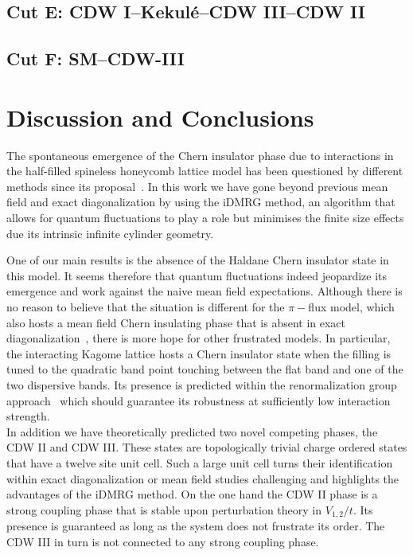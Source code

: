 \documentclass[aps,prx,10pt,twocolumn,floatfix,superscriptaddress,showpacs,numerical,footinbib]{revtex4-1}
\begin{document}
\subsection{Cut E: CDW I--Kekul\'e--CDW III--CDW II}

\subsection{Cut F: SM--CDW-III}


% 




%
\section{\label{sec:discconc}Discussion and Conclusions}
%

The spontaneous emergence of the Chern insulator phase due to interactions in the half-filled spineless honeycomb lattice
model has been questioned by different methods since its proposal~\cite{RQHZ08,WF10,GCC13,GGNVC13,DH14,DCH14}.
%
In this work we have gone beyond previous mean field and exact diagonalization by using the iDMRG method, an algorithm that allows for quantum fluctuations
to play a role but minimises the finite size effects due its intrinsic infinite cylinder geometry.

One of our main results is the absence of the Haldane Chern insulator state in this model.
%
It seems therefore that quantum fluctuations indeed jeopardize its emergence and work against
the naive mean field expectations.
%
Although there is no reason to believe that the situation is different for the $\pi-$flux model, which also hosts a
mean field Chern insulating phase that is absent in exact diagonalization~\cite{WF10,JGC13}, 
there is more hope for other frustrated models.
%
In particular, the interacting Kagome lattice hosts a Chern insulator state when the filling is tuned to
the quadratic band point touching between the flat band and one of the two dispersive bands.
%
Its presence is predicted within the renormalization group approach~\cite{SF08,SYF09} which should guarantee
its robustness at sufficiently low interaction strength.\\
%
In addition we have theoretically predicted two novel competing phases, the CDW II and CDW III.
%
These states are topologically trivial charge ordered states that have a twelve site unit cell.
%
Such a large unit cell turns their identification within exact diagonalization or mean field studies 
challenging and highlights the advantages of the iDMRG method.
%
On the one hand the CDW II phase is a strong coupling phase that is stable upon perturbation theory in $V_{1,2}/t$.
%
Its presence is guaranteed as long as the system does not frustrate its order. 
%
The CDW III in turn is not connected to any strong coupling phase.
\end{document}
